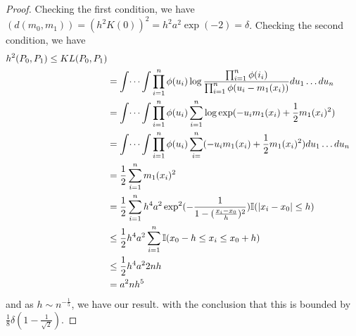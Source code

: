 \begin{proof}
  Checking the first condition, we have $(d(m_{0}, m_{1})) = (h^{2}
  K(0))^{2} = h^{2} a^{2} \exp(-2) = \delta$.
  Checking the second condition, we have
  \begin{align}
    \label{eq:117}
    h^{2}(P_{0}, P_{1}) \leq KL(P_{0}, P_{1})  \\
    &= \int \dots \int \prod_{i=1}^{n} \phi(u_{i}) \log
    \frac{\prod_{i=1}^{n} \phi(i_{i})}{\prod_{i=1}^{n} \phi(u_{i} -
      m_{1}(x_{i}))} d u_{1} \dots d u_{n} \\
    &= \int \dots \int \prod_{i=1}^{n} \phi(u_{i}) \sum_{i=1}^{n} \log
    \exp(- u_{i} m_{1}(x_{i}) + \frac{1}{2} m_{1}(x_{i})^{2}) \\
    &= \int \dots \int \prod_{i=1}^{n} \phi(u_{i}) \sum_{i=}^{n}  ( -
    u_{i} m_{1}(x_{i}) + \frac{1}{2} m_{1}(x_{i})^{2}) d u_{1} \dots
    du_{n} \\
    &= \frac{1}{2} \sum_{i=1}^{n} m_{1}(x_{i})^{2} \\
    &= \frac{1}{2} \sum_{i=1}^{n} h^{4} a^{2} \exp^{2}(-\frac{1}{1 -
      (\frac{x_{i} - x_{0}}{h})^{2}}) \I{|x_{i} - x_{0}| \leq h} \\
    &\leq \frac{1}{2} h^{4} a^{2} \sum_{i=1}^{n} \I{x_{0} - h \leq
      x_{i} \leq x_{0} + h} \\
    &\leq \frac{1}{2} h^{4} a^{2} 2nh \\
    &= a^{2} nh^{5}
  \end{align}
  and as $h \sim n^{-\frac{1}{5}}$, we have our result.
  with the conclusion that this is bounded by $\frac{1}{8} \delta(1 -
  \frac{1}{\sqrt{2}})$.
\end{proof}

